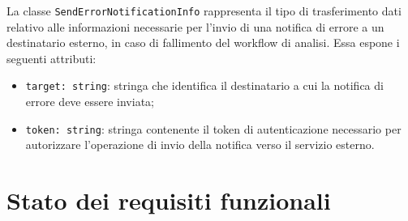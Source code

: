 \documentclass[a4paper, 11pt]{article}
\newcounter{subsubsubsection}[subsubsection]
\begin{document}
\label{sec:SendErrorNotificationInfo}

La classe \texttt{SendErrorNotificationInfo} rappresenta il tipo di trasferimento dati relativo
alle informazioni necessarie per l'invio di una notifica di errore a un destinatario esterno,
in caso di fallimento del workflow di analisi. Essa espone i seguenti attributi:

\begin{itemize}
  \item \texttt{target: string}: stringa che identifica il destinatario a cui la notifica di errore
    deve essere inviata;

  \item \texttt{token: string}: stringa contenente il token di autenticazione necessario per
    autorizzare l'operazione di invio della notifica verso il servizio esterno.
\end{itemize}


 
 
  

\newpage
\section{Stato dei requisiti funzionali}
\end{document}

